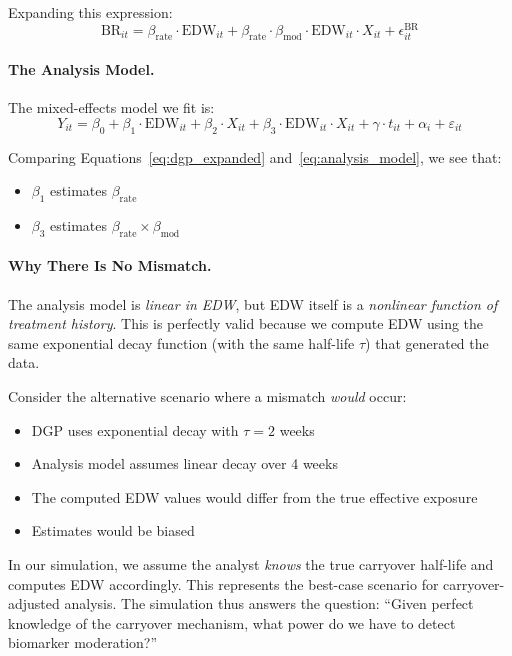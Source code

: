 \documentclass[11pt,letterpaper]{article}
\begin{document}
Expanding this expression:
\begin{equation}
\text{BR}_{it} = \beta_{\text{rate}} \cdot \text{EDW}_{it} +
\beta_{\text{rate}} \cdot \beta_{\text{mod}} \cdot \text{EDW}_{it} \cdot X_{it}
+ \epsilon^{\text{BR}}_{it}
\label{eq:dgp_expanded}
\end{equation}

\paragraph{The Analysis Model.}
The mixed-effects model we fit is:
\begin{equation}
Y_{it} = \beta_0 + \beta_1 \cdot \text{EDW}_{it} + \beta_2 \cdot X_{it} +
\beta_3 \cdot \text{EDW}_{it} \cdot X_{it} + \gamma \cdot t_{it} +
\alpha_i + \varepsilon_{it}
\label{eq:analysis_model}
\end{equation}

Comparing Equations~\ref{eq:dgp_expanded} and~\ref{eq:analysis_model}, we see
that:
\begin{itemize}
    \item $\beta_1$ estimates $\beta_{\text{rate}}$
    \item $\beta_3$ estimates $\beta_{\text{rate}} \times \beta_{\text{mod}}$
\end{itemize}

\paragraph{Why There Is No Mismatch.}
The analysis model is \emph{linear in EDW}, but EDW itself is a
\emph{nonlinear function of treatment history}. This is perfectly valid
because we compute EDW using the same exponential decay function (with the
same half-life $\tau$) that generated the data.

Consider the alternative scenario where a mismatch \emph{would} occur:
\begin{itemize}
    \item DGP uses exponential decay with $\tau = 2$ weeks
    \item Analysis model assumes linear decay over 4 weeks
    \item The computed EDW values would differ from the true effective exposure
    \item Estimates would be biased
\end{itemize}

In our simulation, we assume the analyst \emph{knows} the true carryover
half-life and computes EDW accordingly. This represents the best-case scenario
for carryover-adjusted analysis. The simulation thus answers the question:
``Given perfect knowledge of the carryover mechanism, what power do we have to
detect biomarker moderation?''
\end{document}
